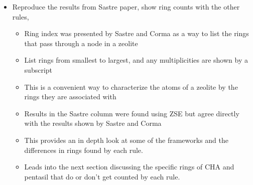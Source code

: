 \documentclass[11pt]{article}
\begin{document}
\begin{itemize}
\item Reproduce the results from Sastre paper, show ring counts with the other rules, 
\begin{itemize}
\item Ring index was presented by Sastre and Corma as a way to list the rings that pass through a node in a zeolite \cite{sastre-topological-2009}
\item List rings from smallest to largest, and any multiplicities are shown by a subscript
\item This is a convenient way to characterize the atoms of a zeolite by the rings they are associated with
\item Results in the Sastre column were found using ZSE but agree directly with the results shown by Sastre and Corma \cite{sastre-topological-2009}
\item This provides an in depth look at some of the frameworks and the differences in rings found by each rule.
\item Leads into the next section discussing the specific rings of CHA and pentasil that do or don't get counted by each rule.
\end{itemize}
\end{itemize}
\end{document}
